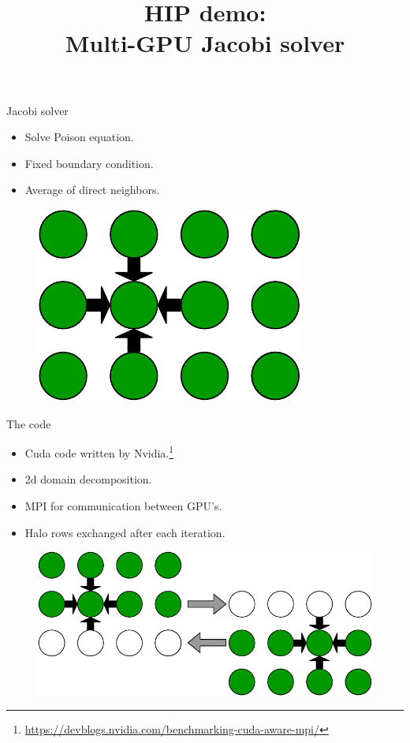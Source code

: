 \documentclass[aspectratio=169]{beamer}
\title[]{HIP demo: \\ Multi-GPU Jacobi solver}
\begin{document}
\begin{frame}
  \titlepage
\end{frame}

\begin{frame}{Jacobi solver}
\begin{itemize}
    \item Solve Poison equation.
    \item Fixed boundary condition.
    \item Average of direct neighbors.
\end{itemize}
\begin{figure}[hb!]
    \centering
    \includegraphics[scale=0.5]{figs/jacobi.pdf}
    \label{fig:my_label}
\end{figure}
\end{frame}

\begin{frame}{The code}
\begin{itemize}
    \item Cuda code written by Nvidia.\footnote{\url{https://devblogs.nvidia.com/benchmarking-cuda-aware-mpi/}}
    \item 2d domain decomposition.
    \item MPI for communication between GPU's.
    \item Halo rows exchanged after each iteration.
\end{itemize}
\begin{figure}[hb!]
    \centering
    \includegraphics[scale=0.5]{figs/halo_sharing.pdf}
    \label{fig:my_label}
\end{figure}


\end{frame}
\end{document}
